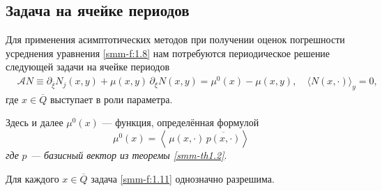 	\subsection{Задача на ячейке периодов}
	Для применения асимптотических методов при получении оценок погрешности усреднения
	уравнения \eqref{smm-f:1.8} нам потребуются периодическое
	решение следующей задачи на ячейке периодов
	\begin{equation}\label{smm-f:1.11}
		\begin{aligned}
			&\mathcal{A}N\equiv \partial_{\bar\xi}N_j(x,y)+\mu(x,y)\,\partial_\xi N(x,y) =\mu^0(x)-\mu(x,y), \quad \langle N(x,\cdot)\rangle_y=0,
				\end{aligned}
	\end{equation}
	где $x\in \overline Q$ выступает в роли параметра.

	
	{Здесь и далее  $\mu^0(x)$ --- функция, определённая
		формулой}
		\begin{equation*}
		\mu^0(x)=\left<\,\mu(x,\cdot)\,\overline{p(x,\cdot)}\right>
	\end{equation*}
	\textit{где} 	\textit{$p$ ---  базисный вектор из теоремы {\ref{smm-th1.2}}}.
	
	\begin{theorem}\label{smm-th1.3}
	Для каждого $x\in\overline{Q}$ задача \eqref{smm-f:1.11}
		однозначно разрешима.
	\end{theorem}

